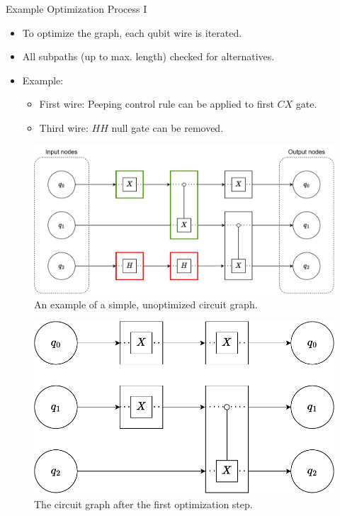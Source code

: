 \begin{frame}{Example Optimization Process I}
    \begin{itemize}
        \item To optimize the graph, each qubit wire is iterated.
        \item All subpaths (up to max. length) checked for alternatives.
        \item Example:
        \begin{itemize}
            \item {\color{commentgreen}First wire}: Peeping control rule can be applied to first $CX$ gate.
            \item {\color{red}Third wire}: $HH$ null gate can be removed. 
        \end{itemize}
    \end{itemize}
    \vfill
    \begin{minipage}{.55\textwidth}
        \begin{figure}[htp]
            \centering     
            \includegraphics[width=.9\textwidth]{../figures/drawio/slides/circuit_graph_unoptimized_colored.pdf}
            \caption{An example of a simple, unoptimized circuit graph.}
        \end{figure}
    \end{minipage}
    \begin{minipage}{.40\textwidth}
        \begin{figure}[htp]
            \centering     
            \includegraphics[width=\textwidth]{../figures/drawio/circuit_graph_optimized_firststep.pdf}
            \caption{The circuit graph after the first optimization step.}
        \end{figure}
    \end{minipage}
\end{frame}

